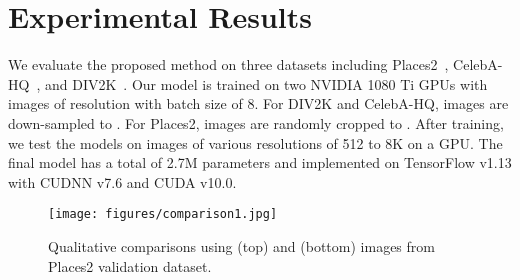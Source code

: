 \documentclass[oribibl]{llncs}  \usepackage[width=122mm,left=12mm,paperwidth=146mm,height=193mm,top=12mm,paperheight=217mm]{geometry}
\begin{document}
\section{Experimental Results}
We evaluate the proposed method on three datasets including Places2~\cite{zhou2017places}, CelebA-HQ~\cite{karras2017progressive}, and DIV2K~\cite{Timofte_2018_CVPR_Workshops}. Our model is trained on two NVIDIA 1080 Ti GPUs with images of resolution  with batch size of 8. For DIV2K and CelebA-HQ, images are down-sampled to . For Places2, images are randomly cropped to . After training, we test the models on images of various resolutions of 512 to 8K on a GPU. The final model has a total of 2.7M parameters and implemented on TensorFlow v1.13 with CUDNN v7.6 and CUDA v10.0. 

\begin{figure*}[t]
	\begin{center}
		\texttt{[image: figures/comparison1.jpg]} 
	\end{center}
	\caption{Qualitative comparisons using  (top) and  (bottom) images from Places2 validation dataset.}
	\label{fig:comparison1}
\end{figure*}
\end{document}
